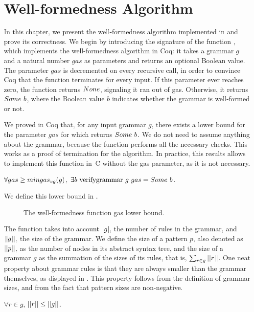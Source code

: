 \chapter{Well-formedness Algorithm}
\label{chapter:wf-algorithm}

In this chapter,
we present the well-formedness algorithm
implemented in \lpeg{}
and prove its correctness.
We begin by introducing the signature
of the function \textit{\verifygrammarname{}},
which implements the well-formedness algorithm in Coq:
it takes a grammar $g$ and a natural number $gas$ as parameters
and returns an optional Boolean value.
The parameter $gas$ is decremented on every recursive call,
in order to convince Coq that the function terminates for every input.
If this parameter ever reaches zero,
the function returns $None$,
signaling it ran out of gas.
Otherwise, it returns $Some\ b$,
where the Boolean value $b$
indicates whether the grammar
is well-formed or not.

We proved in Coq that,
for any input grammar $g$,
there exists a lower bound for the parameter $gas$
for which \textit{\verifygrammarname{}} returns $Some\ b$.
We do not need to assume anything
about the grammar, because the function
performs all the necessary checks.
This works as a proof of termination
for the algorithm.
In practice, this results allows
\lpeg{} to implement this function in~C
without the gas parameter,
as it is not necessary.
\begin{lemma}
    \label{lemma:verifygrammar-termination}
    $\forall gas \ge mingas_{vg}(g)$,
    $\exists b\ \text{verifygrammar{}}\ g\ gas = Some\ b$.
\end{lemma}

We define this lower bound
in .
\begin{figure}
    \centering
    
    \caption{The well-formedness function gas lower bound.}
    \label{fig:verifygrammargas}
\end{figure}
The function takes into account
$|g|$, the number of rules in the grammar,
and $||g||$, the size of the grammar.
We define the size of a pattern $p$, also denoted as $||p||$,
as the number of nodes in its abstract syntax tree,
and the size of a grammar $g$
as the summation of the sizes of its rules,
that is, $\sum_{r \in g} ||r||$.
One neat property about grammar rules is
that they are always smaller than the grammar themselves,
as displayed in .
This property follows from the definition of grammar sizes,
and from the fact that pattern sizes are non-negative.
\begin{lemma}
    \label{lemma:size-of-r-le-size-of-g}
    $\forall r \in g$, $||r|| \le ||g||$.
\end{lemma}


